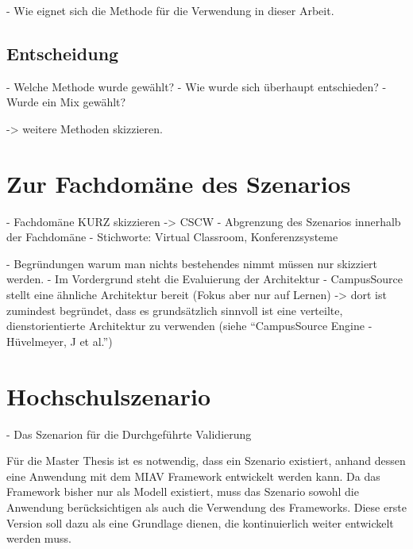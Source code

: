  - Wie eignet sich die Methode für die Verwendung in dieser Arbeit.



\subsection{Entscheidung} %
\label{sub:entscheidung}

  - Welche Methode wurde gewählt?
  - Wie wurde sich überhaupt entschieden?
  - Wurde ein Mix gewählt?


 -> weitere Methoden skizzieren.


\section{Zur Fachdomäne des Szenarios} %
\label{sec:zur_fachdomaene_des_szenarios}

- Fachdomäne KURZ skizzieren -> CSCW
- Abgrenzung des Szenarios innerhalb der Fachdomäne
- Stichworte: Virtual Classroom, Konferenzsysteme

- Begründungen warum man nichts bestehendes nimmt müssen nur skizziert werden.
  - Im Vordergrund steht die Evaluierung der Architektur
  - CampusSource stellt eine ähnliche Architektur bereit (Fokus aber nur auf Lernen) -> dort ist zumindest begründet, dass es grundsätzlich sinnvoll ist eine verteilte, dienstorientierte Architektur zu verwenden (siehe "`CampusSource Engine - Hüvelmeyer, J et al."')


\section{Hochschulszenario} %
\label{sec:hochschulszenario}

  - Das Szenarion für die Durchgeführte Validierung

  Für die Master Thesis ist es notwendig, dass ein Szenario existiert, anhand dessen eine Anwendung mit dem MIAV Framework entwickelt werden kann. Da das Framework bisher nur als Modell existiert, muss das Szenario sowohl die Anwendung berücksichtigen als auch die Verwendung des Frameworks. Diese erste Version soll dazu als eine Grundlage dienen, die kontinuierlich weiter entwickelt werden muss.

